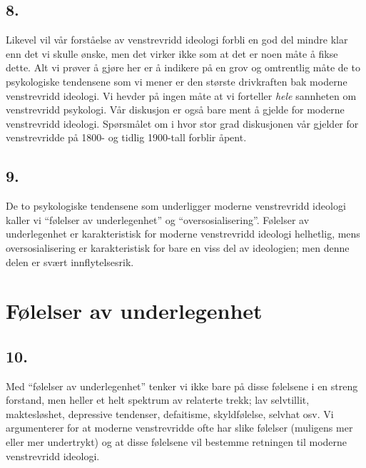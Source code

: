 \documentclass[oneside]{book}
\begin{document}
\section*{8.}
Likevel vil vår forståelse av venstrevridd ideologi forbli en god del mindre
klar enn det vi skulle ønske, men det virker ikke som at det er noen måte å
fikse dette. Alt vi prøver å gjøre her er å indikere på en grov og omtrentlig
måte de to psykologiske tendensene som vi mener er den største drivkraften bak
moderne venstrevridd ideologi. Vi hevder på ingen måte at vi forteller
\emph{hele} sannheten om venstrevridd psykologi. Vår diskusjon er også bare ment
å gjelde for moderne venstrevridd ideologi. Spørsmålet om i hvor stor grad
diskusjonen vår gjelder for venstrevridde på 1800- og tidlig 1900-tall forblir
åpent.

\section*{9.}
De to psykologiske tendensene som underligger moderne venstrevridd ideologi
kaller vi ``følelser av underlegenhet'' og ``oversosialisering''. Følelser av
underlegenhet er karakteristisk for moderne venstrevridd ideologi helhetlig,
mens oversosialisering er karakteristisk for bare en viss del av ideologien;
men denne delen er svært innflytelsesrik.

\chapter{Følelser av underlegenhet}

\section*{10.}
Med ``følelser av underlegenhet'' tenker vi ikke bare på disse følelsene i en
streng forstand, men heller et helt spektrum av relaterte trekk; lav
selvtillit, maktesløshet, depressive tendenser, defaitisme, skyldfølelse,
selvhat osv. Vi argumenterer for at moderne venstrevridde ofte har slike
følelser (muligens mer eller mer undertrykt) og at disse følelsene vil bestemme
retningen til moderne venstrevridd ideologi.
\end{document}
